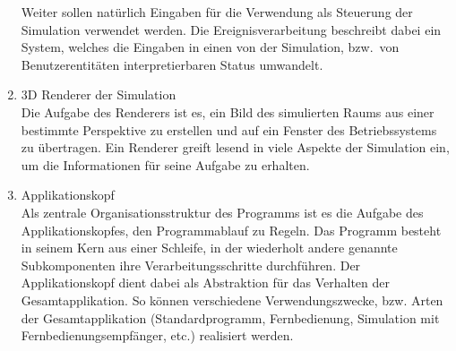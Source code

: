 \documentclass[11pt,twoside,a4paper]{article}
\begin{document}
\begin{enumerate}
Weiter sollen natürlich Eingaben für die Verwendung als Steuerung der Simulation verwendet werden. Die Ereignisverarbeitung beschreibt dabei ein System, welches die Eingaben in einen von der Simulation, bzw.~von Benutzerentitäten interpretierbaren Status umwandelt.
\item 3D Renderer der Simulation\\
Die Aufgabe des Renderers ist es, ein Bild des simulierten Raums aus einer bestimmte Perspektive zu erstellen und auf ein Fenster des Betriebssystems zu übertragen.
Ein Renderer greift lesend in viele Aspekte der Simulation ein, um die Informationen für seine Aufgabe zu erhalten.
\item Applikationskopf\\
Als zentrale Organisationsstruktur des Programms ist es die Aufgabe des Applikationskopfes, den Programmablauf zu Regeln. Das Programm besteht in seinem Kern aus einer Schleife, in der wiederholt andere genannte Subkomponenten ihre Verarbeitungsschritte durchführen. Der Applikationskopf dient dabei als Abstraktion für das Verhalten der Gesamtapplikation. So können verschiedene Verwendungszwecke, bzw. Arten der Gesamtapplikation (Standardprogramm, Fernbedienung, Simulation mit Fernbedienungsempfänger, etc.) realisiert werden.
\end{enumerate}
\end{document}
